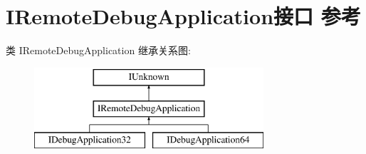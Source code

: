 \hypertarget{interface_i_remote_debug_application}{}\section{I\+Remote\+Debug\+Application接口 参考}
\label{interface_i_remote_debug_application}
类 I\+Remote\+Debug\+Application 继承关系图\+:\begin{figure}[H]
\begin{center}
\leavevmode
\includegraphics[height=3.000000cm]{interface_i_remote_debug_application}
\end{center}
\end{figure}
